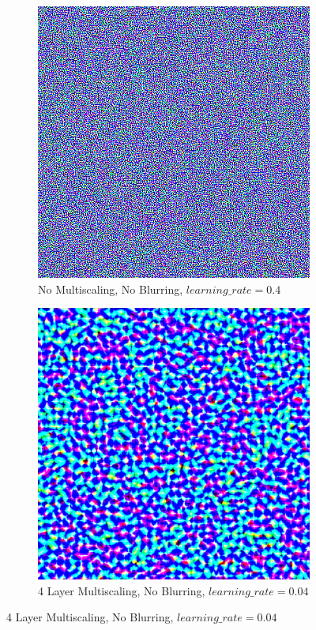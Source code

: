 \begin{figure}
    \captionsetup{justification=centering}

    \begin{subfigure}[t]{0.31\textwidth}
        \captionsetup{justification=centering}
        \centering
        \includegraphics[width=.7\linewidth]{figuras/feat_vis/experiments/layers/initial/l1/random_image_pl1_lr4e-1_layer0_no-blur.png}
        \caption{No Multiscaling, No Blurring, \(learning\_rate = 0.4\)}
    \end{subfigure}
    \hfill
    \begin{subfigure}[t]{0.31\textwidth}
        \captionsetup{justification=centering}
        \centering
        \includegraphics[width=.7\linewidth]{figuras/feat_vis/experiments/layers/initial/l1/random_image_pl4_lr4e-2_layer0_no-blur.png}
        \caption{4 Layer Multiscaling, No Blurring, \(learning\_rate = 0.04\)}

\end{subfigure}
\end{figure}
